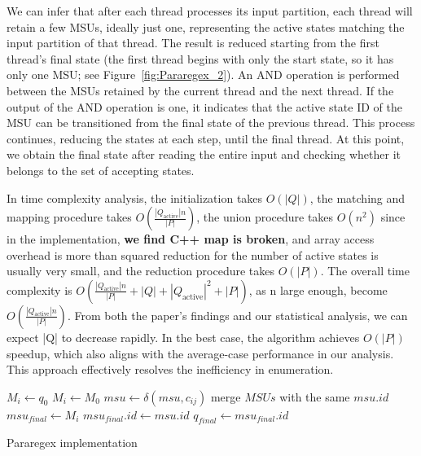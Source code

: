 \documentclass[sigconf]{acmart}
\begin{document}
We can infer that after each thread processes its input partition, each thread will retain a few MSUs, ideally just one, representing the active states matching the input partition of that thread. The result is reduced starting from the first thread's final state (the first thread begins with only the start state, so it has only one MSU; see Figure~\ref{fig:Pararegex_2}). An AND operation is performed between the MSUs retained by the current thread and the next thread. If the output of the AND operation is one, it indicates that the active state ID of the MSU can be transitioned from the final state of the previous thread. This process continues, reducing the states at each step, until the final thread. At this point, we obtain the final state after reading the entire input and checking whether it belongs to the set of accepting states.

In time complexity analysis, the initialization takes $O(\left| Q \right|)$, the matching and mapping procedure takes $O\left(\frac{|Q_{\text{active}}|n}{|P|}\right)$, the union procedure takes $O(n^2)$ since in the implementation, \textbf{we find C++ map is broken}, and array access overhead is more than squared reduction for the number of active states is usually very small, and the reduction procedure takes $O(|P|)$. The overall time complexity is $O\left( \frac{|Q_{\text{active}}|n}{|P|} + |Q| + |Q_{\text{active}}|^2 + |P| \right)$, as n large enough, become $O\left( \frac{|Q_{\text{active}}|n}{|P|} \right)$. From both the paper's findings and our statistical analysis, we can expect |Q| to decrease rapidly. In the best case, the algorithm achieves $O(|P|)$ speedup, which also aligns with the average-case performance in our analysis. This approach effectively resolves the inefficiency in enumeration.

\begin{algorithm}
	{
		{
			$M_i \gets q_0$\;
		}{
			$M_i \gets M_0$\;
		}
		{
			{
				$msu \gets \delta(msu,c_{ij})$
			}
			merge $MSUs$ with the same $msu.id$
		}
	}
	$msu_{final} \gets M_i$
	{
		{
			{
				$msu_{final}.id \gets msu.id$
			}
		}
	}
	$q_{final} \gets msu_{final}.id$
	\caption{Pararegex implementation}
	\label{alg:pararegex}
\end{algorithm}
\end{document}
